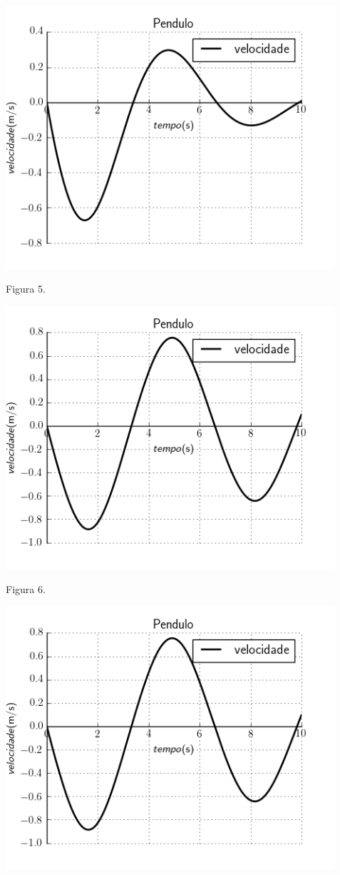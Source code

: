 \documentclass[a4paper]{article} %
\begin{document}
\begin{center}
	
	\includegraphics[width=4.80in,height=3.84in,keepaspectratio = false]{pendulo1_image2.png}
	
	\scriptsize  Figura 5. 
	
	\includegraphics[width=4.80in,height=3.84in,keepaspectratio = false]{pendulo2_image2.png}
	
	\scriptsize  Figura 6. 
	
	\includegraphics[width=4.80in,height=3.84in,keepaspectratio = false]{pendulo3_image2.png}
	

\end{center}
\end{document}
